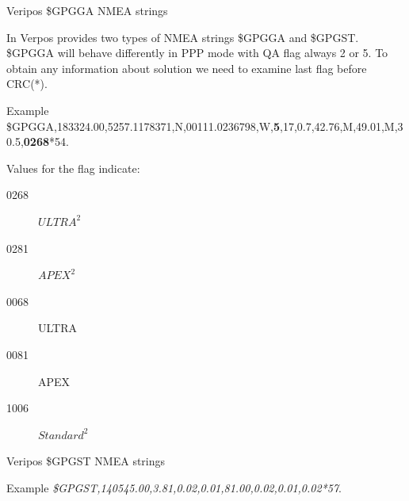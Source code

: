 \documentclass[11pt]{beamer}
\begin{document}
\begin{frame}{Veripos \$GPGGA NMEA strings}
	
	In Verpos provides two types of NMEA strings \$GPGGA and \$GPGST. \$GPGGA will behave differently in PPP mode with QA flag always 2 or 5. To obtain any information about solution we need to examine last flag before CRC(*).\\
	
	
	\begin{exampleblock}{Example}
		{\tiny{\$GPGGA,183324.00,5257.1178371,N,00111.0236798,W,\textbf{5},17,0.7,42.76,M,49.01,M,30.5,{\color{red}\textbf{0268}}*54}.}
	\end{exampleblock}
	
	Values for the flag indicate:	
	\begin{description}
		\item[0268] $ULTRA^2$
		\item [0281]	$APEX^2$
		\item [0068]	ULTRA
		\item [0081]	APEX
		\item [1006]	$Standard^2$
	\end{description}
\end{frame}

\begin{frame}[plain]{Veripos \$GPGST NMEA strings}

	\begin{exampleblock}{Example}
		{\textit{\$GPGST,140545.00,3.81,0.02,0.01,81.00,0.02,0.01,0.02*57}.}
	\end{exampleblock}
	\vspace*{-1cm}
	\begin{table}
		\centering
		\begin{minipage}[t]{\textheight}%
		\end{minipage}
	\end{table}
\end{frame}
\end{document}
